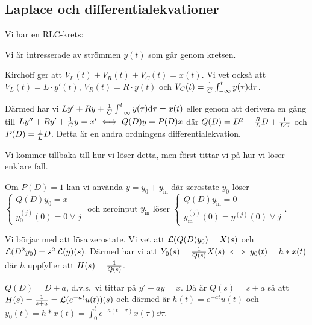 \documentclass[a4paper]{article}
\begin{document}
\providecommand\fname{}
\renewcommand\fname{19-10-01}

\subsection{Laplace och differentialekvationer}
\begin{ex}
    Vi har en RLC-krets:

    \f

    Vi är intresserade av strömmen \(
        y(t)
    \) som går genom kretsen.

    Kirchoff ger att \(
        V_L(t) + V_R(t) + V_C(t) = x(t)
    \). Vi vet också att \(
        V_L(t) = L \cdot y'(t)
    \), \(
        V_R(t) = R \cdot y(t)
    \) och \(
        V_C(t) = \frac{1}{C} \int_{-\infty}^t y(\tau) \dd \tau
    \).

    Därmed har vi \(
        Ly' + Ry + \frac{1}{C} \int_{-\infty}^t y(\tau) \dd \tau = x(t)
    \) eller genom att derivera en gång till \(
        L y'' + Ry' + \frac{1}{C} y = x' 
            \iff Q(D) y = P(D) x
    \) där \(
        Q(D) = D^2 + \frac{R}{L} D + \frac{1}{LC} 
    \) och \(
        P(D) = \frac{1}{L} D
    \). Detta är en andra ordningens differentialekvation.

    Vi kommer tillbaka till hur vi löser detta, men först tittar vi på hur vi
    löser enklare fall.
\end{ex}

Om \(
    P(D) = 1
\) kan vi använda \(
    y = y_0 + y_{\text{in}}
\) där zerostate \(
    y_0
\) löser \(
    \left\{\begin{matrix}
        Q(D)y_0 = x\\  
        y_0^{(j)}(0) = 0 \; \forall \; j 
    \end{matrix}\right.
\) och zeroinput \(
    y_{\text{in}} 
\) löser \(
    \left\{\begin{matrix}
        Q(D)y_{\text{in}} = 0\\ 
        y_\text{in}^{(j)}(0) = y^{(j)}(0) \; \forall \; j 
    \end{matrix}\right.
\).

Vi börjar med att lösa zerostate. Vi vet att \(
    \operatorname{\mathcal{L}}(Q(D)y_0) = X(s)
\) och \(
    \operatorname{\mathcal{L}}(D^2y_0) = s^2\operatorname{\mathcal{L}}(y)(s)
\). Därmed har vi att \(
    Y_0(s) = \frac{1}{Q(s)} X(s) 
        \iff y_0(t) = h*x(t)
\) där \(
    h
\) uppfyller att \(
    H(s) = \frac{1}{Q(s)}
\).

\begin{ex}
    \(
        Q(D) = D + a
    \), d.v.s.\ vi tittar på \(
        y'+ay = x
    \). Då är \(
        Q(s) = s+a
    \) så att \(
        H(s) = \frac{1}{s+a} = \operatorname{\mathcal{L}}(e^{-at}u(t))(s)
    \) och därmed är \(
        h(t) = e^{-at}u(t)
    \) och \(
        y_0(t) = h*x(t) = \int_0^t e^{-a(t-\tau)}x(\tau)\dd \tau
    \).
\end{ex}
\end{document}
